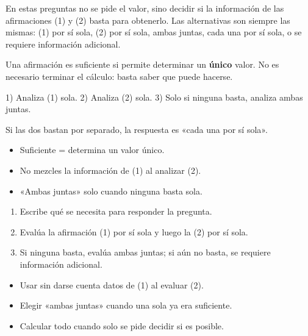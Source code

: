 \documentclass[10pt,a4paper,twocolumn]{article}
\begin{document}
En estas preguntas no se pide el valor, sino decidir si la información de las afirmaciones (1) y (2) basta para obtenerlo. Las alternativas son siempre las mismas: (1) por sí sola, (2) por sí sola, ambas juntas, cada una por sí sola, o se requiere información adicional.

Una afirmación es suficiente si permite determinar un \textbf{único} valor. No es necesario terminar el cálculo: basta saber que puede hacerse.

\begin{definicion}
1) Analiza (1) sola. 2) Analiza (2) sola. 3) Solo si ninguna basta, analiza ambas juntas.

Si las dos bastan por separado, la respuesta es «cada una por sí sola».
\end{definicion}

\begin{ideasclave}
\begin{itemize}
  \item Suficiente = determina un valor único.
  \item No mezcles la información de (1) al analizar (2).
  \item «Ambas juntas» solo cuando ninguna basta sola.
\end{itemize}
\end{ideasclave}

\begin{metodo}
\begin{enumerate}
  \item Escribe qué se necesita para responder la pregunta.
  \item Evalúa la afirmación (1) por sí sola y luego la (2) por sí sola.
  \item Si ninguna basta, evalúa ambas juntas; si aún no basta, se requiere información adicional.
\end{enumerate}
\end{metodo}

\begin{errorfrecuente}
\begin{itemize}
  \item Usar sin darse cuenta datos de (1) al evaluar (2).
  \item Elegir «ambas juntas» cuando una sola ya era suficiente.
  \item Calcular todo cuando solo se pide decidir si es posible.
\end{itemize}
\end{errorfrecuente}
\end{document}
